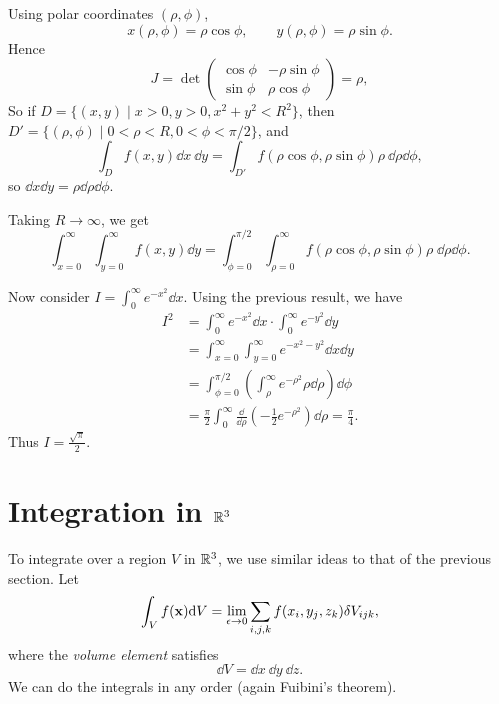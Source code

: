 \documentclass[a4paper]{scrreprt}
\begin{document}
\begin{example}
	Using polar coordinates $(\rho, \phi)$,
	$$
	x(\rho, \phi) = \rho \cos \phi, \quad \quad y(\rho, \phi) = \rho \sin \phi.
	$$
	Hence 
	$$
	J = \det \begin{pmatrix}
		\cos \phi & - \rho \sin \phi \\
		\sin \phi & \rho \cos \phi
	\end{pmatrix} = \rho,
	$$
	So if $D = \{(x, y)  \mid x > 0, y > 0, x^2 + y^2 < R^2 \}$, then $D' = \{(\rho, \phi) \mid 0 < \rho < R, 0 < \phi < \pi/2\}$, and
	$$
	\int_D f(x, y) \dd x\ \dd y = \int_{D'} f(\rho \cos \phi, \rho \sin \phi) \rho\  \dd \rho \dd \phi,
	$$
	so $\dd x \dd y = \rho \dd \rho \dd \phi$.

	Taking $R \rightarrow \infty$, we get
	$$
	\int_{x = 0}^{\infty} \int_{y = 0}^{\infty} f(x, y) \dd y = \int_{\phi = 0}^{\pi/2} \int_{\rho = 0}^{\infty} f(\rho \cos \phi, \rho \sin \phi) \rho \; \dd \rho \dd\phi.
	$$

	Now consider $I = \int_0^{\infty} e^{-x^2} \dd x$. Using the previous result, we have
	\begin{align*}
		I^2 &= \int_{0}^{\infty} e^{-x^{2}} \dd x \cdot \int_{0}^{\infty} e^{-y^{2}} \dd y \\
			&= \int_{x=0}^{\infty} \int_{y=0}^{\infty} e^{-x^{2}-y^{2}} \dd x \dd y \\
			&= \int_{\phi = 0}^{\pi/2} \left(\int_{\rho}^{\infty} e^{- \rho^2} \rho \dd\rho \right) \dd \phi \\
			&= \frac{\pi}{2} \int_0^{\infty} \frac{\dd}{\dd \rho} \left(-\frac{1}{2} e^{- \rho^2}\right) \dd \rho = \frac{\pi}{4}.
	\end{align*}
	Thus $I = \frac{\sqrt{\pi}}{2}$.
\end{example}

\section{Integration in $\mathbb{R}^3$}

To integrate over a region $V$ in $\mathbb{R}^3$, we use similar ideas to that of the previous section. Let
$$
	\int_V f(\mathbf{x}) \mathrm{d} V = \lim_{\epsilon \to 0} \sum_{i, j, k} f(x_i, y_j, z_k) \delta V_{ijk},
$$
where the \emph{volume element} satisfies
$$
\dd V = \dd x \ \dd y \ \dd z.
$$
We can do the integrals in any order (again Fuibini's theorem).
\end{document}
